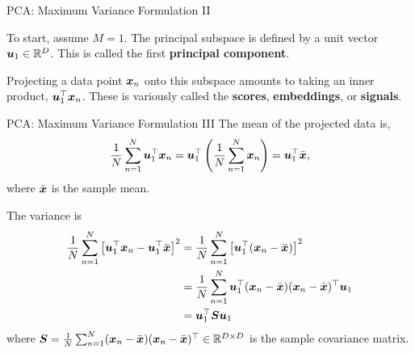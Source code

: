 \documentclass[aspectratio=169]{beamer}
\begin{document}
\begin{frame}[t]{PCA: Maximum Variance Formulation II}

To start, assume $M = 1$. The principal subspace is defined by a unit vector $\boldsymbol{u}_1 \in \mathbb{R}^D$. This is called the first \textbf{principal component}.

Projecting a data point $\boldsymbol{x}_n$ onto this subspace amounts to taking an inner product, $\boldsymbol{u}_1^\top \boldsymbol{x}_n$. These is variously called the \textbf{scores}, \textbf{embeddings}, or \textbf{signals}. 
\end{frame}

\begin{frame}[t]{PCA: Maximum Variance Formulation III}
The mean of the projected data is,
\begin{align}
    \frac{1}{N} \sum_{n=1}^N \boldsymbol{u}_1^\top \boldsymbol{x}_n = \boldsymbol{u}_1^\top \left( \frac{1}{N} \sum_{n=1}^N \boldsymbol{x}_n \right) = \boldsymbol{u}_1^\top \bar{\boldsymbol{x}},
\end{align}
where $\bar{\boldsymbol{x}}$ is the sample mean.

The variance is 
\begin{align}
    \frac{1}{N} \sum_{n=1}^N \left[ \boldsymbol{u}_1^\top \boldsymbol{x}_n - \boldsymbol{u}_1^\top \bar{\boldsymbol{x}} \right]^2 
    &= \frac{1}{N} \sum_{n=1}^N \left[ \boldsymbol{u}_1^\top (\boldsymbol{x}_n - \bar{\boldsymbol{x}}) \right]^2 \\
    &=\frac{1}{N} \sum_{n=1}^N \boldsymbol{u}_1^\top (\boldsymbol{x}_n - \bar{\boldsymbol{x}}) (\boldsymbol{x}_n - \bar{\boldsymbol{x}})^\top \boldsymbol{u}_1 \\
    &=\boldsymbol{u}_1^\top \boldsymbol{S} \boldsymbol{u}_1
\end{align}
where $\boldsymbol{S} = \frac{1}{N} \sum_{n=1}^N (\boldsymbol{x}_n - \bar{\boldsymbol{x}}) (\boldsymbol{x}_n - \bar{\boldsymbol{x}})^\top \in \mathbb{R}^{D \times D}$ is the sample covariance matrix.
\end{frame}
\end{document}
